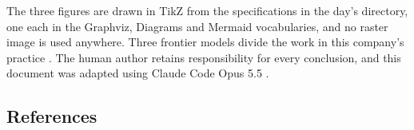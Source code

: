The three figures are drawn in TikZ from the specifications in the day's
 directory, one each in the Graphviz, Diagrams and Mermaid
vocabularies, and no raster image is used anywhere. Three frontier models divide
the work in this company's practice \cite{tripartisan2026}. The human author
retains responsibility for every conclusion, and this document was adapted using
Claude Code Opus 5.5 \cite{repo2026}.

\subsection{References}

\begin{apprefs}
\nocite{*}


\end{apprefs}
